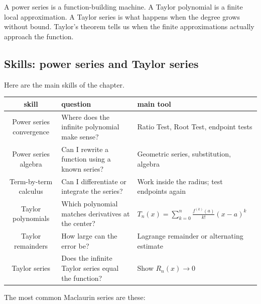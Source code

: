A power series is a function-building machine.  A Taylor polynomial is a finite local
approximation.  A Taylor series is what happens when the degree grows without bound.
Taylor's theorem tells us when the finite approximations actually approach the function.

\subsection{Skills: power series and Taylor series}
\label{subsec:skills-power-series-taylor-series}

Here are the main skills of the chapter.

\begin{center}
\renewcommand{\arraystretch}{1.45}
\begin{tabular}{c|l|l}
\textbf{skill} & \textbf{question} & \textbf{main tool} \\ \hline
Power series convergence &
Where does the infinite polynomial make sense? &
Ratio Test, Root Test, endpoint tests \\

Power series algebra &
Can I rewrite a function using a known series? &
Geometric series, substitution, algebra \\

Term-by-term calculus &
Can I differentiate or integrate the series? &
Work inside the radius; test endpoints again \\

Taylor polynomials &
Which polynomial matches derivatives at the center? &
\(\displaystyle T_n(x)=\sum_{k=0}^n\frac{f^{(k)}(a)}{k!}(x-a)^k\) \\

Taylor remainders &
How large can the error be? &
Lagrange remainder or alternating estimate \\

Taylor series &
Does the infinite Taylor series equal the function? &
Show \(R_n(x)\to0\)
\end{tabular}
\end{center}

The most common Maclaurin series are these:

